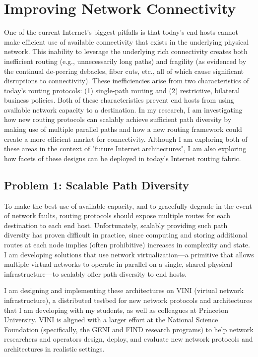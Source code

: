 \section*{Improving Network Connectivity}

One of the current Internet's biggest pitfalls is that today's end hosts
cannot make efficient use of available connectivity that exists in the
underlying physical network.  This inability to leverage the underlying
rich connectivity creates both inefficient routing (e.g., unnecessarily
long paths) and fragility (as evidenced by the continual de-peering
debacles, fiber cuts, etc., all of which cause significant disruptions
to connectivity).  These inefficiencies arise from two characteristics
of today's routing protocols: (1) single-path routing and (2)
restrictive, bilateral business policies.  Both of these characteristics
prevent end hosts from using available network capacity to a
destination.  In my research, I am investigating how new routing
protocols can scalably achieve sufficient path diversity by making use
of multiple parallel paths and how a new routing framework could create
a more efficient market for connectivity.  Although I am exploring both
of these areas in the context of "future Internet architectures", I am
also exploring how facets of these designs can be deployed in today's
Internet routing fabric.

\subsection*{Problem 1: Scalable Path Diversity}

To make the best use of available capacity, and to gracefully degrade in
the event of network faults, routing protocols should expose multiple
routes for each destination to each end host.  Unfortunately, scalably
providing such path diversity has proven difficult in practice, since
computing and storing additional routes at each node implies (often
prohibitive) increases in complexity and state.  I am developing
solutions that use network virtualization---a primitive that allows
multiple virtual networks to operate in parallel on a single, shared
physical infrastructure---to scalably offer path diversity to end hosts.

I am designing and implementing these architectures on VINI (virtual
network infrastructure), a distributed testbed for new network protocols
and architectures that I am developing with my students, as well as
colleagues at Princeton University.  VINI is aligned with a larger
effort at the National Science Foundation (specifically, the GENI and
FIND research programs) to help network researchers and operators
design, deploy, and evaluate new network protocols and architectures in
realistic settings.

